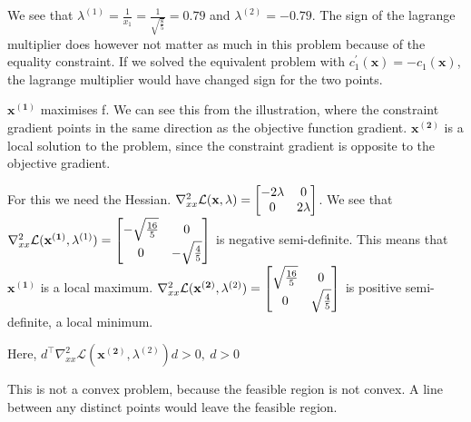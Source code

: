 
We see that $\lambda^{(1)} = \frac{1}{x_1} = \frac{1}{\sqrt{ \frac{8}{5}}} = 0.79$ and $\lambda^{(2)} = -0.79$. The sign of the lagrange multiplier does however not 
matter as much in this problem because of the equality constraint. If we solved the equivalent problem with $c_1^{'}(\mathbf{x}) = -c_1(\mathbf{x})$, the lagrange multiplier
would have changed sign for the two points. 


$\mathbf{x^{(1)}}$ maximises f. We can see this from the illustration, where the constraint gradient points in the same direction as the objective function gradient. 
$\mathbf{x^{(2)}}$ is a local solution to the problem, since the constraint gradient is opposite to the objective gradient.


For this we need the Hessian. $\nabla _{xx}^2\mathcal{L}(\mathbf{x}, \lambda) = \begin{bmatrix} -2\lambda & 0 \\ 0 & 2\lambda \end{bmatrix}$. 
We see that $\nabla _{xx}^2\mathcal{L}(\mathbf{x^{(1)}}, \lambda^{(1)}) = \begin{bmatrix} -\sqrt{ \frac{16}{5}} & 0 \\ 0 & -\sqrt{ \frac{4}{5}} \end{bmatrix}$ is negative semi-definite. This means that 
$\mathbf{x^{(1)}}$ is a local maximum.
$\nabla _{xx}^2\mathcal{L}(\mathbf{x^{(2)}}, \lambda^{(2)}) = \begin{bmatrix} \sqrt{ \frac{16}{5}} & 0 \\ 0 & \sqrt{ \frac{4}{5}} \end{bmatrix}$ is positive semi-definite, a local minimum.

Here, $d^{\top}\nabla _{xx}^2\mathcal{L}(\mathbf{x^{(2)}}, \lambda^{(2)})d > 0,\ d > 0$



This is not a convex problem, because the feasible region is not convex. A line between any distinct points would leave the feasible region.